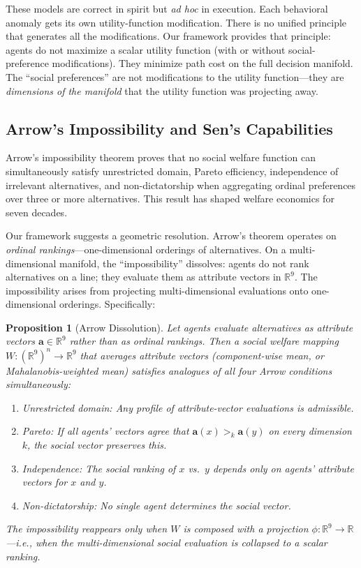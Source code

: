 \documentclass[12pt]{article}
\newtheorem{proposition}[theorem]{Proposition}
\theoremstyle{definition}
\theoremstyle{remark}
\newcommand{\R}{\mathbb{R}}
\begin{document}
These models are correct in spirit but \emph{ad hoc} in execution.  Each behavioral anomaly gets its own utility-function modification.  There is no unified principle that generates all the modifications.  Our framework provides that principle: agents do not maximize a scalar utility function (with or without social-preference modifications).  They minimize path cost on the full decision manifold.  The ``social preferences'' are not modifications to the utility function---they are \emph{dimensions of the manifold} that the utility function was projecting away.

\subsection{Arrow's Impossibility and Sen's Capabilities}

Arrow's impossibility theorem \cite{arrow1951} proves that no social welfare function can simultaneously satisfy unrestricted domain, Pareto efficiency, independence of irrelevant alternatives, and non-dictatorship when aggregating ordinal preferences over three or more alternatives.  This result has shaped welfare economics for seven decades.

Our framework suggests a geometric resolution.  Arrow's theorem operates on \emph{ordinal rankings}---one-dimensional orderings of alternatives.  On a multi-dimensional manifold, the ``impossibility'' dissolves: agents do not rank alternatives on a line; they evaluate them as attribute vectors in $\R^9$.  The impossibility arises from projecting multi-dimensional evaluations onto one-dimensional orderings.  Specifically:

\begin{proposition}[Arrow Dissolution]
\label{prop:arrow}
Let agents evaluate alternatives as attribute vectors $\mathbf{a} \in \R^9$ rather than as ordinal rankings.  Then a social welfare \emph{mapping} $W: (\R^9)^n \to \R^9$ that averages attribute vectors (component-wise mean, or Mahalanobis-weighted mean) satisfies analogues of all four Arrow conditions simultaneously:
\begin{enumerate}
    \item \emph{Unrestricted domain:} Any profile of attribute-vector evaluations is admissible.
    \item \emph{Pareto:} If all agents' vectors agree that $\mathbf{a}(x) >_k \mathbf{a}(y)$ on every dimension $k$, the social vector preserves this.
    \item \emph{Independence:} The social ranking of $x$ vs.\ $y$ depends only on agents' attribute vectors for $x$ and $y$.
    \item \emph{Non-dictatorship:} No single agent determines the social vector.
\end{enumerate}
The impossibility reappears only when $W$ is composed with a projection $\phi: \R^9 \to \R$---i.e., when the multi-dimensional social evaluation is collapsed to a scalar ranking.
\end{proposition}
\end{document}
